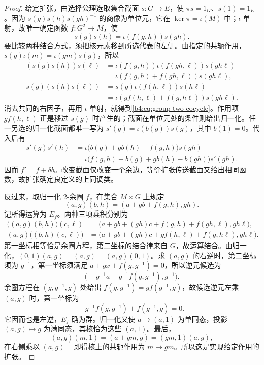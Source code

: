 \begin{proof}
	给定扩张，由选择公理选取集合截面 \(s:G\to E\)，使 \(\pi s=1_G\)、\(s(1)=1_E\)。因为 \(s(g)s(h)s(gh)^{-1}\) 的商像为单位元，它在 \(\ker\pi=\iota(M)\) 中；\(\iota\) 单射，故唯一确定函数 \(f:G^2\to M\)，使
	\[
		s(g)s(h)=\iota(f(g,h))s(gh).
	\]
	要比较两种结合方式，须把核元素移到所选代表的左侧。由指定的共轭作用，\(s(g)\iota(m)=\iota(gm)s(g)\)，所以
	\[
		\begin{aligned}
			(s(g)s(h))s(\ell) &=\iota(f(g,h))\iota(f(gh,\ell))s(gh\ell)\\
			&=\iota(f(g,h)+f(gh,\ell))s(gh\ell),\\
			s(g)(s(h)s(\ell)) &=s(g)\iota(f(h,\ell))s(h\ell)\\
			&=\iota(g f(h,\ell)+f(g,h\ell))s(gh\ell).
		\end{aligned}
	\]
	消去共同的右因子，再用 \(\iota\) 单射，就得到\eqref{b4:eq:group-two-cocycle}。作用项 \(g f(h,\ell)\) 正是移过 \(s(g)\) 时产生的；截面在单位元处的条件则给出归一化。任一另选的归一化截面都唯一写为 \(s'(g)=\iota(b(g))s(g)\)，其中 \(b(1)=0\)。代入后有
	\[
		\begin{aligned}
			s'(g)s'(h) &=\iota\bigl(b(g)+g b(h)+f(g,h)\bigr)s(gh)\\
			&=\iota\bigl(f(g,h)+b(g)+g b(h)-b(gh)\bigr)s'(gh).
		\end{aligned}
	\]
	因而 \(f'=f+\delta b\)。改变截面仅改变一个余边，等价扩张传送截面又给出相同函数，故扩张确定良定义的上同调类。

	反过来，取归一化 \(2\)-余圈 \(f\)，在集合 \(M\times G\) 上规定
	\[
		(a,g)(b,h)=(a+g b+f(g,h),gh).
	\]
	记所得运算为 \(E_f\)。两种三项乘积分别为
	\[
		\begin{aligned}
			\bigl((a,g)(b,h)\bigr)(c,\ell) &=\bigl(a+gb+(gh)c+f(g,h)+f(gh,\ell),gh\ell\bigr),\\
			(a,g)\bigl((b,h)(c,\ell)\bigr) &=\bigl(a+gb+(gh)c+g f(h,\ell)+f(g,h\ell),gh\ell\bigr).
		\end{aligned}
	\]
	第一坐标相等恰是余圈方程，第二坐标的结合律来自 \(G\)，故运算结合。由归一化，\((0,1)(a,g)=(a,g)=(a,g)(0,1)\)。求 \((a,g)\) 的右逆时，第二坐标须为 \(g^{-1}\)，第一坐标须满足 \(a+gx+f(g,g^{-1})=0\)，所以逆元候选为
	\[
		\bigl(-g^{-1}a-g^{-1}f(g,g^{-1}),g^{-1}\bigr).
	\]
	余圈方程在 \((g,g^{-1},g)\) 处给出 \(f(g,g^{-1})=g f(g^{-1},g)\)，故候选逆元左乘 \((a,g)\) 时，第一坐标为
	\[
		-g^{-1}f(g,g^{-1})+f(g^{-1},g)=0.
	\]
	它因而也是左逆，\(E_f\) 确为群。归一化又使 \(a\mapsto(a,1)\) 为单同态，投影 \((a,g)\mapsto g\) 为满同态，其核恰为这些 \((a,1)\)。最后，
	\[
		(a,g)(m,1)=(a+gm,g)=(gm,1)(a,g),
	\]
	在右侧乘以 \((a,g)^{-1}\) 即得核上的共轭作用为 \(m\mapsto gm\)。所以这是实现给定作用的扩张。


\end{proof}
